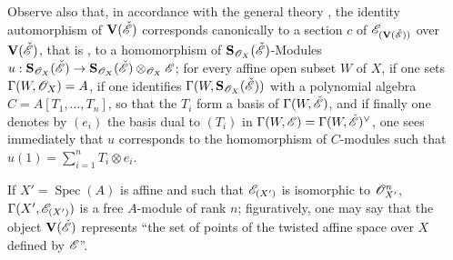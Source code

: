 Observe also that, in accordance with the general theory , the identity automorphism of $\mathbf{V}(\check{\mathscr{E}})$ corresponds canonically to a section $c$ of $\mathscr{E}_{(\mathbf{V}(\check{\mathscr{E}}))}$ over $\mathbf{V}(\check{\mathscr{E}})$, that is , to a homomorphism of $\mathbf{S}_{\mathscr{O}_X}(\check{\mathscr{E}})$-Modules $u:\mathbf{S}_{\mathscr{O}_X}(\check{\mathscr{E}})\to\mathbf{S}_{\mathscr{O}_X}(\check{\mathscr{E}})\otimes_{\mathscr{O}_X}\mathscr{E}$; for every affine open subset $W$ of $X$, if one sets $\Gamma(W,\mathscr{O}_X)=A$, if one identifies $\Gamma(W,\mathbf{S}_{\mathscr{O}_X}(\check{\mathscr{E}}))$ with a polynomial algebra $C=A[T_1,\ldots,T_n]$, so that the $T_i$ form a basis of $\Gamma(W,\check{\mathscr{E}})$, and if finally one denotes by $(e_i)$ the basis dual to $(T_i)$ in $\Gamma(W,\mathscr{E})=\Gamma(W,\check{\mathscr{E}})^\vee$, one sees immediately that $u$ corresponds to the homomorphism of $C$-modules such that $u(1)=\sum_{i=1}^n T_i\otimes e_i$.

If $X'=\operatorname{Spec}(A)$ is affine and such that $\mathscr{E}_{(X')}$ is isomorphic to $\mathscr{O}_{X'}^n$, $\Gamma(X',\mathscr{E}_{(X')})$ is a free $A$-module of rank $n$; figuratively, one may say that the object $\mathbf{V}(\check{\mathscr{E}})$ represents ``the set of points of the twisted affine space over $X$ defined by $\mathscr{E}$''.

